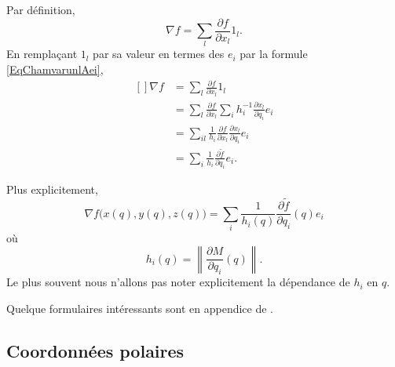 Par définition,
\begin{equation}
    \nabla f=\sum_l\frac{ \partial f }{ \partial x_l }1_l.
\end{equation}
En remplaçant $1_l$ par sa valeur en termes des $e_i$ par la formule \eqref{EqChamvarunlAei},
\begin{equation}
    \begin{aligned}[]
        \nabla f&=\sum_l\frac{ \partial f }{ \partial x_l }1_l\\
        &=\sum_l\frac{ \partial f }{ \partial x_l }\sum_ih_i^{-1}\frac{ \partial x_l }{ \partial q_i }e_i\\
        &=\sum_{il}\frac{1}{ h_i }\frac{ \partial f }{ \partial x_l }\frac{ \partial x_l }{ \partial q_i }e_i\\
        &=\sum_i\frac{1}{ h_i }\frac{ \partial \tilde f }{ \partial q_i }e_i.
    \end{aligned}
\end{equation}

Plus explicitement,
\begin{equation}        \label{EqGradientenCurviligne}
    \nabla f\big( x(q),y(q),z(q) \big)=\sum_i \frac{1}{ h_i(q) }\frac{ \partial \tilde f }{ \partial q_i }(q)e_i
\end{equation}
où
\begin{equation}
    h_i(q)=\left\| \frac{ \partial M }{ \partial q_i }(q) \right\|.
\end{equation}
Le plus souvent nous n'allons pas noter explicitement la dépendance de $h_i$ en $q$.

Quelque formulaires intéressants sont en appendice de \cite{Schomblond_em}.

\subsection{Coordonnées polaires}

